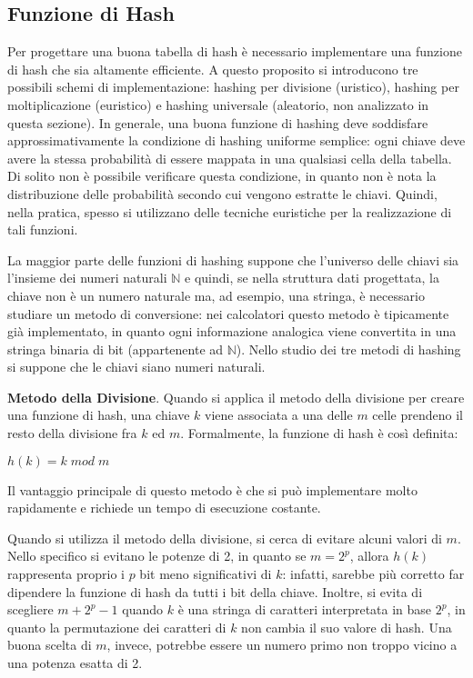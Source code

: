 \subsection{Funzione di Hash}
Per progettare una buona tabella di hash è necessario implementare una funzione di hash che sia altamente efficiente. A questo proposito si introducono tre possibili schemi di implementazione: hashing per divisione (uristico), hashing per moltiplicazione (euristico) e hashing universale (aleatorio, non analizzato in questa sezione). In generale, una buona funzione di hashing deve soddisfare approssimativamente la condizione di hashing uniforme semplice: ogni chiave deve avere la stessa probabilità di essere mappata in una qualsiasi cella della tabella. Di solito non è possibile verificare questa condizione, in quanto non è nota la distribuzione delle probabilità secondo cui vengono estratte le chiavi. Quindi, nella pratica, spesso si utilizzano delle tecniche euristiche per la realizzazione di tali funzioni.

La maggior parte delle funzioni di hashing suppone che l'universo delle chiavi sia l'insieme dei numeri naturali \(\mathbb{N}\) e quindi, se nella struttura dati progettata, la chiave non è un numero naturale ma, ad esempio, una stringa, è necessario studiare un metodo di conversione: nei calcolatori questo metodo è tipicamente già implementato, in quanto ogni informazione analogica viene convertita in una stringa binaria di bit (appartenente ad \(\mathbb{N}\)). Nello studio dei tre metodi di hashing si suppone che le chiavi siano numeri naturali.

\vspace{10pt}

\textbf{Metodo della Divisione}. Quando si applica il metodo della divisione per creare una funzione di hash, una chiave \(k\) viene associata a una delle \(m\) celle prendeno il resto della divisione fra \(k\) ed \(m\). Formalmente, la funzione di hash è così definita:

\(h(k)=k\; mod\; m\)

\noindent Il vantaggio principale di questo metodo è che si può implementare molto rapidamente e richiede un tempo di esecuzione costante. 

Quando si utilizza il metodo della divisione, si cerca di evitare alcuni valori di \(m\). Nello specifico si evitano le potenze di 2, in quanto se \(m=2^p\), allora \(h(k)\) rappresenta proprio i \(p\) bit meno significativi di \(k\): infatti, sarebbe più corretto far dipendere la funzione di hash da tutti i bit della chiave. Inoltre, si evita di scegliere \(m+2^p-1\) quando \(k\) è una stringa di caratteri interpretata in base \(2^p\), in quanto la permutazione dei caratteri di \(k\) non cambia il suo valore di hash. Una buona scelta di \(m\), invece, potrebbe essere un numero primo non troppo vicino a una potenza esatta di 2.

